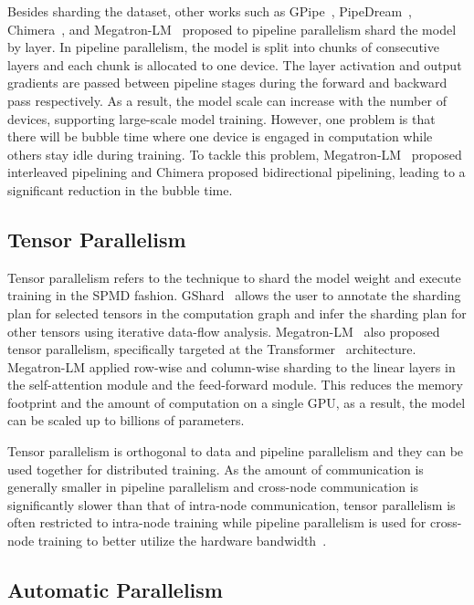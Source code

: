 Besides sharding the dataset, other works such as GPipe~\cite{gpipe}, PipeDream~\cite{pipedream}, Chimera~\cite{chimera}, and Megatron-LM~\cite{shoeybi2019megatron} proposed to pipeline parallelism shard the model by layer. In pipeline parallelism, the model is split into chunks of consecutive layers and each chunk is allocated to one device. The layer activation and output gradients are passed between pipeline stages during the forward and backward pass respectively. As a result, the model scale can increase with the number of devices, supporting large-scale model training. However, one problem is that there will be bubble time where one device is engaged in computation while others stay idle during training. To tackle this problem, Megatron-LM~\cite{shoeybi2019megatron} proposed interleaved pipelining and Chimera proposed bidirectional pipelining, leading to a significant reduction in the bubble time. 

\subsection{Tensor Parallelism}

Tensor parallelism refers to the technique to shard the model weight and execute training in the SPMD fashion. GShard~\cite{gshard} allows the user to annotate the sharding plan for selected tensors in the computation graph and infer the sharding plan for other tensors using iterative data-flow analysis. Megatron-LM~\cite{shoeybi2019megatron} also proposed tensor parallelism, specifically targeted at the Transformer~\cite{transformer} architecture. Megatron-LM applied row-wise and column-wise sharding to the linear layers in the self-attention module and the feed-forward module. This reduces the memory footprint and the amount of computation on a single GPU, as a result, the model can be scaled up to billions of parameters.

Tensor parallelism is orthogonal to data and pipeline parallelism and they can be used together for distributed training. As the amount of communication is generally smaller in pipeline parallelism and cross-node communication is significantly slower than that of intra-node communication, tensor parallelism is often restricted to intra-node training while pipeline parallelism is used for cross-node training to better utilize the hardware bandwidth~\cite{shoeybi2019megatron}.


\subsection{Automatic Parallelism}

